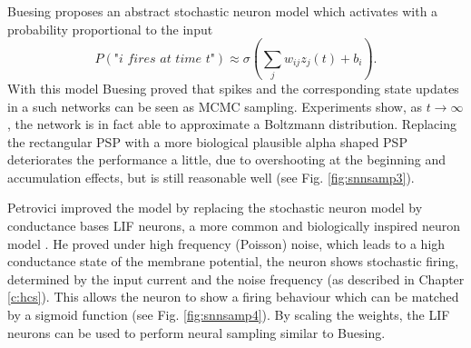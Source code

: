 Buesing proposes an abstract stochastic neuron model which activates with a probability proportional to the input
\[
P(\textit{"i fires at time t"}) \approx \sigma(\sum_j w_{ij} z_j(t) + b_i).
\]
With this model Buesing proved that spikes and the corresponding state updates in a such networks can be seen as MCMC sampling. Experiments show, as $t \rightarrow \infty$ , the network is in fact able to approximate a Boltzmann distribution.
Replacing the rectangular PSP with a more biological plausible alpha shaped PSP deteriorates the performance a little, due to overshooting at the beginning and accumulation effects, but is still reasonable well (see Fig. \ref{fig:snnsamp3}).

Petrovici improved the model by replacing the stochastic neuron model by conductance bases LIF neurons, a more common and biologically inspired neuron model \cite{Petrovici2016}.
He proved under high frequency (Poisson) noise, which leads to a high conductance state of the membrane potential, the neuron shows stochastic firing, determined by the input current and the noise frequency (as described in Chapter \ref{c:hcs}).
This allows the neuron to show a firing behaviour which can be matched by a sigmoid function (see Fig. \ref{fig:snnsamp4}).  
By scaling the weights, the LIF neurons can be used to perform neural sampling similar to Buesing.

